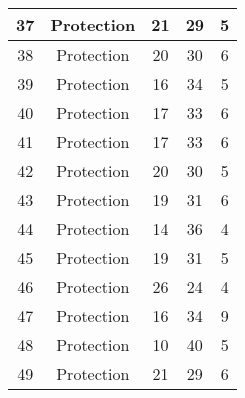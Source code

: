 \documentclass[results.tex]{subfiles}
\begin{document}
\begin{center}
\begin{tabular}{| c || c | c | c | c |}
            \hline
            37                      & Protection                   & 21                     & 29                      & 5                    \\
            \hline
            38                      & Protection                   & 20                     & 30                      & 6                    \\
            \hline
            39                      & Protection                   & 16                     & 34                      & 5                    \\
            \hline
            40                      & Protection                   & 17                     & 33                      & 6                    \\
            \hline
            41                      & Protection                   & 17                     & 33                      & 6                    \\
            \hline
            42                      & Protection                   & 20                     & 30                      & 5                    \\
            \hline
            43                      & Protection                   & 19                     & 31                      & 6                    \\
            \hline
            44                      & Protection                   & 14                     & 36                      & 4                    \\
            \hline
            45                      & Protection                   & 19                     & 31                      & 5                    \\
            \hline
            46                      & Protection                   & 26                     & 24                      & 4                    \\
            \hline
            47                      & Protection                   & 16                     & 34                      & 9                    \\
            \hline
            48                      & Protection                   & 10                     & 40                      & 5                    \\
            \hline
            49                      & Protection                   & 21                     & 29                      & 6                    \\
            \hline
        \end{tabular}
    \end{center}
\end{document}
